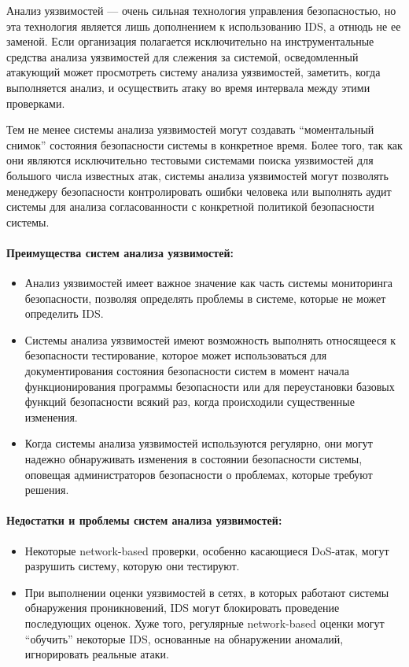 Анализ уязвимостей — очень сильная технология управления безопасностью, но эта технология является лишь дополнением к использованию IDS, а отнюдь не ее заменой. Если организация полагается исключительно на инструментальные средства анализа уязвимостей для слежения за системой, осведомленный атакующий может просмотреть систему анализа уязвимостей, заметить, когда выполняется анализ, и осуществить атаку во время интервала между этими проверками. 

Тем не менее системы анализа уязвимостей могут создавать ``моментальный снимок'' состояния безопасности системы в конкретное время. Более того, так как они являются исключительно тестовыми системами поиска уязвимостей для большого числа известных атак, системы анализа уязвимостей могут позволять менеджеру безопасности контролировать ошибки человека или выполнять аудит системы для анализа согласованности с конкретной политикой безопасности системы.

\paragraph*{Преимущества систем анализа уязвимостей:}

\begin{itemize}
	\item Анализ уязвимостей имеет важное значение как часть системы мониторинга безопасности, позволяя определять проблемы в системе, которые не может определить IDS.

	\item Системы анализа уязвимостей имеют возможность выполнять относящееся к безопасности тестирование, которое может использоваться для документирования состояния безопасности систем в момент начала функционирования программы безопасности или для переустановки базовых функций безопасности всякий раз, когда происходили существенные изменения.
	
	\item Когда системы анализа уязвимостей используются регулярно, они могут надежно обнаруживать изменения в состоянии безопасности системы, оповещая администраторов безопасности о проблемах, которые требуют решения.
\end{itemize}


\paragraph*{Недостатки и проблемы систем анализа уязвимостей:}

\begin{itemize}
	\item Некоторые network-based проверки, особенно касающиеся DoS-атак, могут разрушить систему, которую они тестируют.

	\item При выполнении оценки уязвимостей в сетях, в которых работают системы обнаружения проникновений, IDS могут блокировать проведение последующих оценок. Хуже того, регулярные network-based оценки могут ``обучить'' некоторые IDS, основанные на обнаружении аномалий, игнорировать реальные атаки.
\end{itemize}


